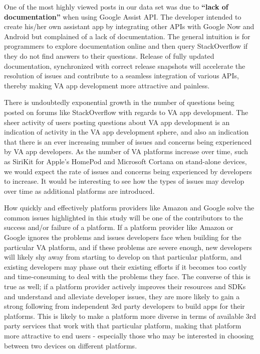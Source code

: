 \documentclass{sigchi}
\begin{document}
One of the most highly viewed posts in our data set was due to \textbf{``lack of documentation''} when using Google Assist API. The developer intended to create his/her own assistant app by integrating other APIs with Google Now and Android but complained of a lack of documentation. The general intuition is for programmers to explore documentation online and then query StackOverflow if they do not find answers to their questions. Release of fully updated documentation, synchronized with correct release snapshots will accelerate the resolution of issues and contribute to a seamless integration of various APIs, thereby making VA app development more attractive and painless.

There is undoubtedly exponential growth in the number of questions being posted on forums like StackOverflow with regards to VA app development. The sheer activity of users posting questions about VA app development is an indication of activity in the VA app development sphere, and also an indication that there is an ever increasing number of issues and concerns being experienced by VA app developers. As the number of VA platforms increase over time, such as SiriKit for Apple's HomePod and Microsoft Cortana on stand-alone devices, we would expect the rate of issues and concerns being experienced by developers to increase. It would be interesting to see how the types of issues may develop over time as additional platforms are introduced.

How quickly and effectively platform providers like Amazon and Google solve the common issues highlighted in this study will be one of the contributors to the success and/or failure of a platform. If a platform provider like Amazon or Google ignores the problems and issues developers face when building for the particular VA platform, and if these problems are severe enough, 
new developers will likely shy away from starting to develop on that particular platform, and existing developers may phase out their existing efforts if it becomes too costly and time-consuming to deal with the problems they face. The converse of this is true as well; if a platform provider actively improves their resources and SDKs and understand and alleviate developer issues, they are more likely to gain a strong following from independent 3rd party developers to build apps for their platforms. This is likely to make a platform more diverse in terms of available 3rd party services that work with that particular platform, making that platform more attractive to end users - especially those who may be interested in choosing between two devices on different platforms.
\end{document}
